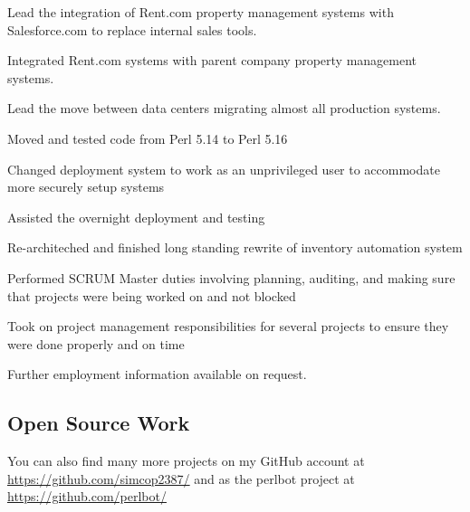 \documentclass[table,tmargin=1in,bmargin=1in,letterpaper]{resume}
\begin{document}
\begin{compactitem}
\item Lead the integration of Rent.com property management systems with Salesforce.com to replace internal sales tools.
\item Integrated Rent.com systems with parent company property management systems.
\item Lead the move between data centers migrating almost all production systems.
  \begin{compactitem}
  \item Moved and tested code from Perl 5.14 to Perl 5.16
  \item Changed deployment system to work as an unprivileged user to accommodate more securely setup systems
  \item Assisted the overnight deployment and testing
  \end{compactitem}
\item Re-architeched and finished long standing rewrite of inventory automation system
\item Performed SCRUM Master duties involving planning, auditing, and making sure that projects were being worked on and not blocked
\item Took on project management responsibilities for several projects to ensure they were done properly and on time
\end{compactitem}

Further employment information available on request.

\vspace{0.2in}
\subsection{Open Source Work}


\begin{compactitem}
\item You can also find many more projects on my GitHub account at \url{https://github.com/simcop2387/} and as the perlbot project at \url{https://github.com/perlbot/}
\end{compactitem}
\end{document}
